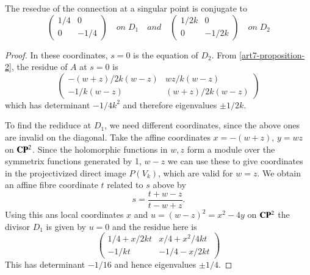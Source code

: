 \begin{prop}\label{art7-proposition-4}
The resedue of the connection at a singular point is conjugate to
$$
\left(
\begin{matrix}
1/4 & 0\\
0 & -1/4
\end{matrix}
\right)
\quad 
on\; D_{1} \quad and \quad
\left(
\begin{matrix}
1/2k & 0\\
0 & -1/2k
\end{matrix}
\right)
\quad on \; D_{2}
$$
\end{prop}

 \begin{proof}
In these coordinates, $s=0$ is the equation of $D_{2}$. From \eqref{art7-proposition-2}, the residue of $A$ at $s=0$ is
\begin{equation}\label{art7-eq-13}
\left(
\begin{matrix}
-(w+z)/2k(w-z) & wz/k(w-z)\\
-1/k(w-z) & (w+z)/2k(w-z)
\end{matrix}
\right)
\end{equation}
which has determinant $-1/4k^{2}$ and therefore eigenvalues $\pm1/2k$.

To find the rediduce at $D_{1}$, we need different coordinates, since the above ones are invalid on the diagonal. Take the affine coordinates $x=-(w+z)$, $y=wz$ on $\mathbf{C}\mathbf{P}^{2}$. Since the holomorphic functions in $w, z$ form a module over the symmetrix functions generated by 1, $w -z$ we can use these to give  coordinates in the projectivized direct image $P(V_{k})$, which are valid for $w=z$. We obtain an affine fibre coordinate $t$ related to $s$ above by
$$
s = \dfrac{t+w-z}{t-w+z}.
$$
Using this ans local coordinates $x$ and  $u= (w-z)^{2} =x^{2}-4y$ on $\mathbf{C}\mathbf{P}^{2}$ the divisor $D_{1}$ is given by $u=0$ and the residue here is
\begin{equation}\label{art7-eq-14}
\left(
\begin{matrix}
1/4+x/2kt & x/4+x^{2}/4kt\\
-1/kt & -1/4-x/2kt
\end{matrix}
\right)
\end{equation}
This has determinant $-1/16$ and hence eigenvalues $\pm1/4$.
 \end{proof}

